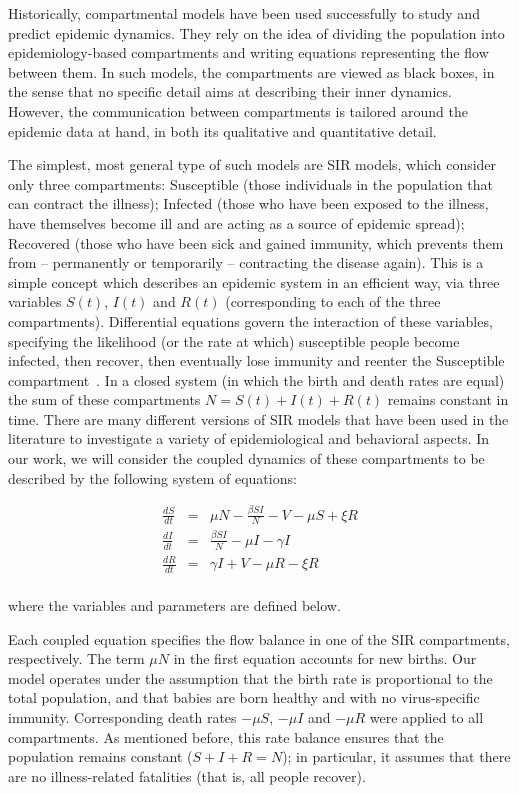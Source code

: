 \documentclass[10pt]{article}
\begin{document}
Historically, compartmental models have been used successfully to study  and predict epidemic dynamics. They rely on the idea of dividing the population into epidemiology-based compartments and writing equations representing the flow between them. In such models, the compartments are viewed as black boxes, in the sense that no specific detail aims at describing their inner dynamics. However, the communication between compartments is tailored around the epidemic data at hand, in both its qualitative and quantitative detail. 

The simplest, most general type of such models are SIR models, which consider only three compartments: Susceptible (those individuals in the population that can contract the illness); Infected (those who have been exposed to the illness, have themselves become ill and are acting as a source of epidemic spread); Recovered (those who have been sick and gained immunity, which prevents them from -- permanently or temporarily -- contracting the disease again). This is a simple concept which describes an epidemic system in an efficient way, via three variables $S(t)$, $I(t)$ and $R(t)$ (corresponding to each of the three compartments). Differential equations govern the interaction of these variables, specifying the likelihood (or the rate at which) susceptible people become infected, then recover, then eventually lose immunity and reenter the Susceptible compartment~\cite{zaman2007stability,ullah2013stability,kuniya2018stability}.
In a closed system (in which the birth and death rates are equal) the sum of
these compartments $N = S(t) + I(t) + R(t)$ remains constant in time. There are many different versions of SIR models that have been used in the literature to investigate a variety of epidemiological and behavioral aspects. In our work, we will consider the coupled dynamics of these compartments to be described by the following system of equations:

\begin{eqnarray*}
\frac{dS}{dt} &=&  \mu N - \frac{\beta S I}{N} - V - \mu S + \xi R \\
\frac{dI}{dt} &=&  \frac{\beta S I}{N} - \mu I - \gamma I  \\
\frac{dR}{dt} &=&  \gamma I + V - \mu R - \xi R\\
\end{eqnarray*}

\noindent where the variables and parameters are defined below.

Each coupled equation specifies the flow balance in one of the SIR compartments, respectively. The term $\mu N$ in the first equation accounts for new births. Our model operates under the assumption that the birth rate is proportional to the total population, and that babies are born healthy and with no virus-specific immunity. Corresponding death rates $-\mu S$, $-\mu I$ and $-\mu R$ were applied to all compartments. As mentioned before, this rate balance ensures that the population remains constant ($S+I+R=N$); in particular, it assumes that there are no illness-related fatalities (that is, all people recover). 
\end{document}
